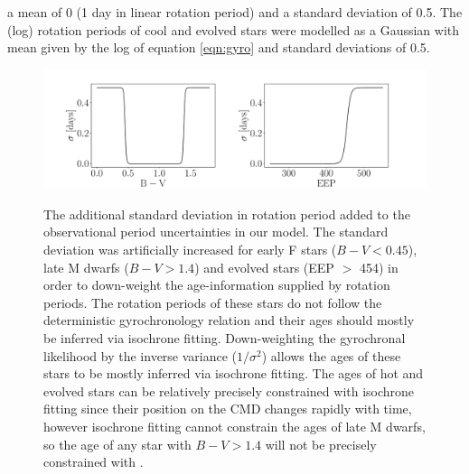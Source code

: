 a mean of 0 (1 day in linear rotation period) and a standard deviation of
0.5.
The (log) rotation periods of cool and evolved stars were modelled as a
Gaussian with mean given by the log of equation \ref{eqn:gyro} and standard
deviations of 0.5.
\begin{figure}
  \caption{
    The additional standard deviation in rotation period added to the
    observational period uncertainties in our model.
    The standard deviation was artificially increased for early F stars ($B-V
    < 0.45$), late M dwarfs ($B-V > 1.4$) and evolved stars (EEP $>$ 454) in
    order to down-weight the age-information supplied by rotation periods.
    The rotation periods of these stars do not follow the deterministic
    gyrochronology relation and their ages should mostly be inferred via
    isochrone fitting.
    Down-weighting the gyrochronal likelihood by the inverse variance
    ($1/\sigma^2$) allows the ages of these stars to be mostly inferred
    via isochrone fitting.
    The ages of hot and evolved stars can be relatively precisely constrained
    with isochrone fitting since their position on the CMD changes
    rapidly with time, however isochrone fitting cannot constrain the ages of
    late M dwarfs, so the age of any star with $B-V > 1.4$ will not be
    precisely constrained with \sd.
}
  \centering
    \includegraphics[width=1.\textwidth]{variance}
\label{fig:variance}
\end{figure}



